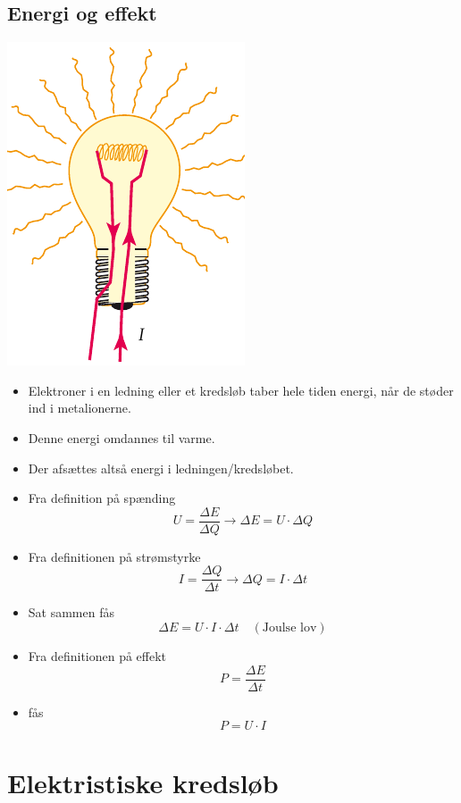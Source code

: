 \documentclass[11pt]{article}
\begin{document}
\subsection*{Energi og effekt}
\label{sec:orgaf3b3e6}
\begin{center}
\includegraphics[width=.9\linewidth]{./img/energi_og_effekt.png}
\end{center}
\begin{itemize}
\item Elektroner i en ledning eller et kredsløb taber hele tiden energi, når de støder ind i metalionerne.
\item Denne energi omdannes til varme.
\item Der afsættes altså energi i ledningen/kredsløbet.
\end{itemize}
\begin{itemize}
\item Fra definition på spænding
$$U = \frac{\Delta E}{\Delta Q} \to \Delta E = U \cdot \Delta Q$$
\item Fra definitionen på strømstyrke
$$I = \frac{\Delta Q}{\Delta t} \to \Delta Q = I \cdot \Delta t$$
\item Sat sammen fås
$$\boxed{\Delta E = U \cdot I \cdot \Delta t \quad (\text{Joulse lov})}$$
\item Fra definitionen på effekt
$$P = \frac{\Delta E}{\Delta t}$$
\item fås
$$\boxed{P = U \cdot I}$$
\end{itemize}

\section*{Elektristiske kredsløb}
\label{sec:org8e7ac9d}
\end{document}
